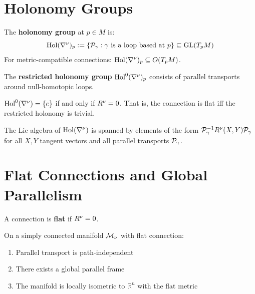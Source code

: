 \section{Holonomy Groups}

\begin{definition}
\label{def:holonomy-group}
The \textbf{holonomy group} at $p \in M$ is:
\[
    \mathrm{Hol}(\nabla^\nu)_p := \{\mathcal{P}_\gamma : \gamma \text{ is a loop based at } p\}
    \subseteq \mathrm{GL}(T_pM)
\]
For metric-compatible connections: $\mathrm{Hol}(\nabla^\nu)_p \subseteq O(T_pM)$.
\end{definition}

\begin{definition}
\label{def:restricted-holonomy}
The \textbf{restricted holonomy group} $\mathrm{Hol}^0(\nabla^\nu)_p$
consists of parallel transports around null-homotopic loops.
\end{definition}

\begin{theorem}
\label{thm:holonomy-curvature}
$\mathrm{Hol}^0(\nabla^\nu) = \{e\}$ if and only if $R^\nu = 0$.
That is, the connection is flat iff the restricted holonomy is trivial.
\end{theorem}

\begin{proposition}
\label{prop:ambrose-singer}
The Lie algebra of $\mathrm{Hol}(\nabla^\nu)$ is spanned by elements of the form
$\mathcal{P}_\gamma^{-1} R^\nu(X, Y) \mathcal{P}_\gamma$ for all
$X, Y$ tangent vectors and all parallel transports $\mathcal{P}_\gamma$.
\end{proposition}

\section{Flat Connections and Global Parallelism}

\begin{definition}
\label{def:flat-connection}
A connection is \textbf{flat} if $R^\nu = 0$.
\end{definition}

\begin{theorem}
\label{thm:global-parallelism}
On a simply connected manifold $\mathcal{M}_\nu$ with flat connection:
\begin{enumerate}[label=(\roman*)]
    \item Parallel transport is path-independent
    \item There exists a global parallel frame
    \item The manifold is locally isometric to $\mathbb{R}^n$ with the flat metric
\end{enumerate}
\end{theorem}

